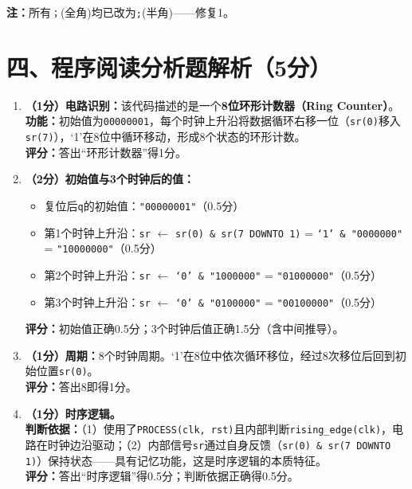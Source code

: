 \noindent\textbf{注：}所有\texttt{；}(全角)均已改为\texttt{;}(半角)——修复1。

\section{四、程序阅读分析题解析（5分）}

\begin{enumerate}[label=(\arabic*)]

\item \textbf{（1分）电路识别：}该代码描述的是一个\textbf{8位环形计数器（Ring Counter）}。\\
\textbf{功能：}初始值为\texttt{00000001}，每个时钟上升沿将数据循环右移一位（\texttt{sr(0)}移入\texttt{sr(7)}），`1'在8位中循环移动，形成8个状态的环形计数。\\
\textbf{评分：}答出“环形计数器”得1分。

\item \textbf{（2分）初始值与3个时钟后的值：}
\begin{itemize}
  \item 复位后\texttt{q}的初始值：\texttt{"00000001"}（0.5分）
  \item 第1个时钟上升沿：\texttt{sr} $\leftarrow$ \texttt{sr(0) \& sr(7 DOWNTO 1)} = \texttt{`1' \& "0000000"} = \texttt{"10000000"}（0.5分）
  \item 第2个时钟上升沿：\texttt{sr} $\leftarrow$ \texttt{`0' \& "1000000"} = \texttt{"01000000"}（0.5分）
  \item 第3个时钟上升沿：\texttt{sr} $\leftarrow$ \texttt{`0' \& "0100000"} = \texttt{"00100000"}（0.5分）
\end{itemize}
\textbf{评分：}初始值正确0.5分；3个时钟后值正确1.5分（含中间推导）。

\item \textbf{（1分）周期：}8个时钟周期。`1'在8位中依次循环移位，经过8次移位后回到初始位置\texttt{sr(0)}。\\
\textbf{评分：}答出8即得1分。

\item \textbf{（1分）时序逻辑。}\\
\textbf{判断依据：}（1）使用了\texttt{PROCESS(clk, rst)}且内部判断\texttt{rising\_edge(clk)}，电路在时钟边沿驱动；（2）内部信号\texttt{sr}通过自身反馈（\texttt{sr(0) \& sr(7 DOWNTO 1)}）保持状态——具有记忆功能，这是时序逻辑的本质特征。\\
\textbf{评分：}答出“时序逻辑”得0.5分；判断依据正确得0.5分。

\end{enumerate}

